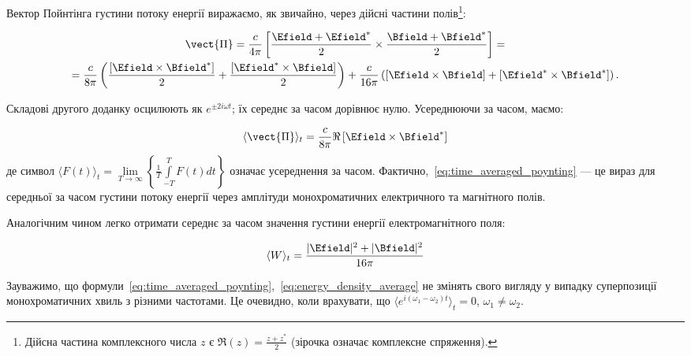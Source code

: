 Вектор Пойнтінга густини потоку енергії виражаємо, як звичайно, через дійсні частини полів\footnote{%
	Дійсна частина комплексного числа $z$ є $\Re{(z)} = \frac{z + z^*}2$ (зірочка означає комплексне спряження).}:

\begin{multline*}
	\vect{\Pi} = \frac{c}{4\pi} \left[ \frac{\Efield + \Efield^{*}}{2} \times \frac{\Bfield + \Bfield^{*}}{2} \right] = \\
	= \frac{c}{8\pi} \left( \frac{[\Efield \times \Bfield^{*}]}2 + \frac{[\Efield^{*} \times \Bfield]}2 \right) + \frac{c}{16\pi} \left( [\Efield \times \Bfield] +
	[\Efield^{*} \times \Bfield^{*}] \right).
\end{multline*}

Складові другого доданку осцилюють як \(e^{\pm 2i\omega t}\); їх середнє за часом дорівнює нулю. Усереднюючи за часом,
маємо:

\begin{equation}
	\langle \vect{\Pi} \rangle_t = \frac{c}{8\pi} \Re\left[\Efield \times \Bfield^{*}\right]
	\label{eq:time_averaged_poynting}
\end{equation}
де символ \(\langle F(t) \rangle_t = \lim\limits_{T \to \infty} \left\{ \frac{1}{T} \int\limits_{-T}^{T} F(t) dt
\right\}\) означає усереднення за часом. Фактично,~\eqref{eq:time_averaged_poynting} --- це вираз для середньої за часом
густини потоку енергії через амплітуди монохроматичних електричного та магнітного полів.

Аналогічним чином легко отримати середнє за часом значення густини енергії електромагнітного поля:

\begin{equation}
	\langle W \rangle_t = \frac{\lvert \Efield \rvert^2 + \lvert \Bfield \rvert^2}{16\pi}
	\label{eq:energy_density_average}
\end{equation}

Зауважимо, що формули~\eqref{eq:time_averaged_poynting},~\eqref{eq:energy_density_average} не змінять свого вигляду у
випадку суперпозиції монохроматичних хвиль з різними частотами. Це очевидно, коли врахувати, що \(\langle e^{i(\omega_1
- \omega_2)t} \rangle_t = 0\), \(\omega_1 \neq \omega_2\).

